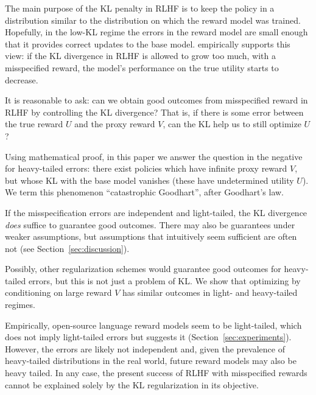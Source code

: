 \documentclass{article}
\begin{document}
The main purpose of the KL penalty in RLHF is to keep the policy in a distribution similar to the distribution on which the reward model was trained. Hopefully, in the low-KL regime the errors in the reward model are small enough that it provides correct updates to the base model.  empirically supports this view: if the KL divergence in RLHF is allowed to grow too much, with a misspecified reward, the model's performance on the true utility starts to decrease.

It is reasonable to ask: can we obtain good outcomes from misspecified reward in RLHF by controlling the KL divergence? That is, if there is some error between the true reward $U$ and the proxy reward $V$, can the KL help us to still optimize $U$?

Using mathematical proof, in this paper we 
answer the question in the negative for heavy-tailed errors: there exist policies which have infinite proxy reward $V$, but whose KL with the base model vanishes (these have undetermined utility $U$).  We term this phenomenon ``catastrophic Goodhart'', after Goodhart's law.

If the misspecification errors are independent and light-tailed, the KL divergence \emph{does} suffice to guarantee good outcomes. There may also be 
 guarantees under weaker assumptions, but assumptions that intuitively seem sufficient are often not (see Section~\ref{sec:discussion}).

Possibly, other regularization schemes would guarantee good outcomes for heavy-tailed errors, but this is not just a problem of KL. We show that optimizing by conditioning on large reward $V$ has similar outcomes in light- and heavy-tailed regimes.

Empirically, open-source language reward models seem to be light-tailed, which does not imply light-tailed errors but suggests it (Section~\ref{sec:experiments}). However, the errors are likely not independent and, given the prevalence of heavy-tailed distributions in the real world, future reward models may also be heavy tailed. In any case, the present success of RLHF with misspecified rewards cannot be explained solely by the KL regularization in its objective.

\end{document}
